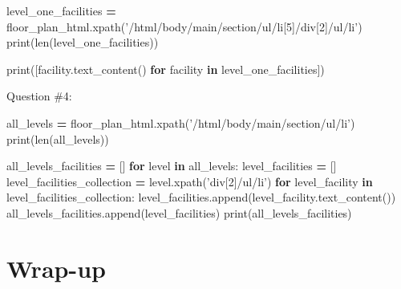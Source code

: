 \documentclass[
]{book}
\newenvironment{Shaded}{\begin{snugshade}}{\end{snugshade}}
\newcommand{\BuiltInTok}[1]{#1}
\newcommand{\ControlFlowTok}[1]{\textcolor[rgb]{0.13,0.29,0.53}{\textbf{#1}}}
\newcommand{\KeywordTok}[1]{\textcolor[rgb]{0.13,0.29,0.53}{\textbf{#1}}}
\newcommand{\NormalTok}[1]{#1}
\newcommand{\OperatorTok}[1]{\textcolor[rgb]{0.81,0.36,0.00}{\textbf{#1}}}
\newcommand{\StringTok}[1]{\textcolor[rgb]{0.31,0.60,0.02}{#1}}
\begin{document}
\begin{Shaded}
\begin{Highlighting}[]
\NormalTok{level_one_facilities }\OperatorTok{=}\NormalTok{ floor_plan_html.xpath(}\StringTok{'/html/body/main/section/ul/li[5]/div[2]/ul/li'}\NormalTok{)}
\BuiltInTok{print}\NormalTok{(}\BuiltInTok{len}\NormalTok{(level_one_facilities))}
\end{Highlighting}
\end{Shaded}

\begin{Shaded}
\begin{Highlighting}[]
\BuiltInTok{print}\NormalTok{([facility.text_content() }\ControlFlowTok{for}\NormalTok{ facility }\KeywordTok{in}\NormalTok{ level_one_facilities])}
\end{Highlighting}
\end{Shaded}

Question \#4:

\begin{Shaded}
\begin{Highlighting}[]
\NormalTok{all_levels }\OperatorTok{=}\NormalTok{ floor_plan_html.xpath(}\StringTok{'/html/body/main/section/ul/li'}\NormalTok{)}
\BuiltInTok{print}\NormalTok{(}\BuiltInTok{len}\NormalTok{(all_levels))}
\end{Highlighting}
\end{Shaded}

\begin{Shaded}
\begin{Highlighting}[]
\NormalTok{all_levels_facilities }\OperatorTok{=}\NormalTok{ []}
\ControlFlowTok{for}\NormalTok{ level }\KeywordTok{in}\NormalTok{ all_levels:}
\NormalTok{    level_facilities }\OperatorTok{=}\NormalTok{ []}
\NormalTok{    level_facilities_collection }\OperatorTok{=}\NormalTok{ level.xpath(}\StringTok{'div[2]/ul/li'}\NormalTok{)}
    \ControlFlowTok{for}\NormalTok{ level_facility }\KeywordTok{in}\NormalTok{ level_facilities_collection:}
\NormalTok{        level_facilities.append(level_facility.text_content())}
\NormalTok{    all_levels_facilities.append(level_facilities)}
\BuiltInTok{print}\NormalTok{(all_levels_facilities)}
\end{Highlighting}
\end{Shaded}

\hypertarget{wrap-up-6}{%
\section{Wrap-up}\label{wrap-up-6}}
\end{document}
